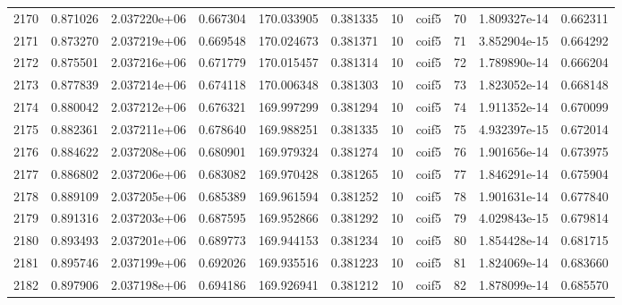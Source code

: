 \begin{tabular}{lrrrrrrlrrr}
2170 &    0.871026 &        2.037220e+06 &  0.667304 &              170.033905 &    0.381335 &      10 &        coif5 &     70 &   1.809327e-14 &      0.662311 \\
2171 &    0.873270 &        2.037219e+06 &  0.669548 &              170.024673 &    0.381371 &      10 &        coif5 &     71 &   3.852904e-15 &      0.664292 \\
2172 &    0.875501 &        2.037216e+06 &  0.671779 &              170.015457 &    0.381314 &      10 &        coif5 &     72 &   1.789890e-14 &      0.666204 \\
2173 &    0.877839 &        2.037214e+06 &  0.674118 &              170.006348 &    0.381303 &      10 &        coif5 &     73 &   1.823052e-14 &      0.668148 \\
2174 &    0.880042 &        2.037212e+06 &  0.676321 &              169.997299 &    0.381294 &      10 &        coif5 &     74 &   1.911352e-14 &      0.670099 \\
2175 &    0.882361 &        2.037211e+06 &  0.678640 &              169.988251 &    0.381335 &      10 &        coif5 &     75 &   4.932397e-15 &      0.672014 \\
2176 &    0.884622 &        2.037208e+06 &  0.680901 &              169.979324 &    0.381274 &      10 &        coif5 &     76 &   1.901656e-14 &      0.673975 \\
2177 &    0.886802 &        2.037206e+06 &  0.683082 &              169.970428 &    0.381265 &      10 &        coif5 &     77 &   1.846291e-14 &      0.675904 \\
2178 &    0.889109 &        2.037205e+06 &  0.685389 &              169.961594 &    0.381252 &      10 &        coif5 &     78 &   1.901631e-14 &      0.677840 \\
2179 &    0.891316 &        2.037203e+06 &  0.687595 &              169.952866 &    0.381292 &      10 &        coif5 &     79 &   4.029843e-15 &      0.679814 \\
2180 &    0.893493 &        2.037201e+06 &  0.689773 &              169.944153 &    0.381234 &      10 &        coif5 &     80 &   1.854428e-14 &      0.681715 \\
2181 &    0.895746 &        2.037199e+06 &  0.692026 &              169.935516 &    0.381223 &      10 &        coif5 &     81 &   1.824069e-14 &      0.683660 \\
2182 &    0.897906 &        2.037198e+06 &  0.694186 &              169.926941 &    0.381212 &      10 &        coif5 &     82 &   1.878099e-14 &      0.685570 \\

\end{tabular}
